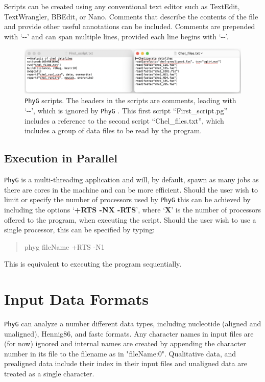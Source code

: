 \documentclass[11pt]{book}
\newcommand{\phyg}{\texttt{PhyG} }
\begin{document}
{{		Scripts can be created using any conventional text editor such as TextEdit, TextWrangler, 
		BBEdit, or Nano. Comments that describe the contents of the file and provide other useful 
		annotations can be included. Comments are prepended with `-{}-' and can span multiple 
		lines, provided each line begins with `-{}-'. 

		\begin{figure}[H]
		\centering
		\includegraphics[width=\textwidth]{First_run.jpg}
		\caption{\phyg scripts. The headers in the scripts are comments, leading with `-{}-', which is 
		ignored by \phyg. This first script ``First\_script.pg'' includes a reference to the second script
		``Chel\_files.txt'', which includes a group of data files to be read by the program.}
		\label{firstscript}
		\end{figure}
	
	\subsection{Execution in Parallel}
		\label{subsec:parallel}
		\phyg is a multi-threading application and will, by default, spawn as many jobs as there 
		are cores in the machine and can be more efficient. Should the user wish to limit or 
		specify the number of processors used by \phyg this can be achieved by including the 
		options `\textbf{+RTS -NX -RTS}', where `\textbf{X}' is the number of processors offered 
		to the program, when executing the script. Should the user wish to use a single processor, 
		this can be specified by typing:

		\begin{quote}
		phyg fileName +RTS -N1 
		\end{quote}
		
		\smallskip
		
		\noindent This is equivalent to executing the program sequentially.		

		
\section{Input Data Formats} 
	\phyg can analyze a number different data types, including nucleotide 
	(aligned and unaligned), Hennig86, and fastc formats.
	Any character names in input files are (for now) ignored and internal names are created
	by appending the character number in its file to the filename as in "fileName:0".
	Qualitative data, and prealigned data include their index in their input files and unaligned 
	data are treated as a single character.
	
}}
\end{document}
